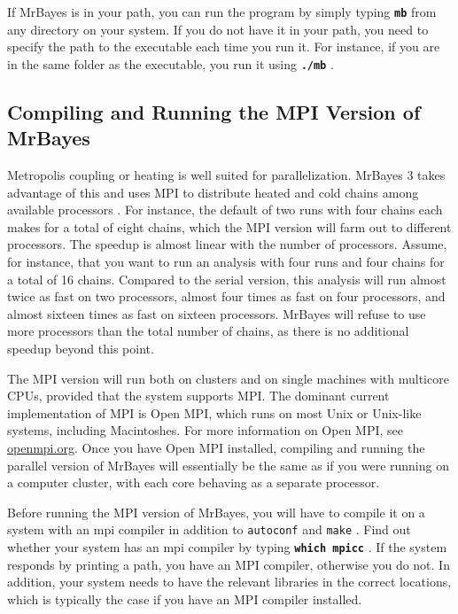 \documentclass[12pt]{book}
\newcommand{\ttt}[1]{\texttt{#1} }
\newcommand{\tb}[1]{\texttt{\textbf{#1}} }
\begin{document}
If MrBayes is in your path, you can run the program by simply typing \tb{mb} from any directory on
your system. If you do not have it in your path, you need to specify the path to the executable
each time you run it. For instance, if you are in the same folder as the executable, you run it
using \tb{./mb}.

\subsection{Compiling and Running the MPI Version of MrBayes}
\label{MPIversion}

Metropolis coupling or heating is well suited for parallelization. MrBayes 3 takes advantage of
this and uses MPI to distribute heated and cold chains among available processors
\citep{altekar04}. For instance, the default of two runs with four chains each makes for a total of
eight chains, which the MPI version will farm out to different processors. The speedup is almost
linear with the number of processors.  Assume, for instance, that you want to run an analysis with
four runs and four chains for a total of 16 chains. Compared to the serial version, this analysis
will run almost twice as fast on two processors, almost four times as fast on four processors, and
almost sixteen times as fast on sixteen processors.  MrBayes will refuse to use more processors
than the total number of chains, as there is no additional speedup beyond this point.

The MPI version will run both on clusters and on single machines with multicore CPUs, provided that
the system supports MPI. The dominant current implementation of MPI is Open MPI, which runs on most
Unix or Unix-like systems, including Macintoshes. For more information on Open MPI, see
\url{openmpi.org}. Once you have Open MPI installed, compiling and running the parallel version of
MrBayes will essentially be the same as if you were running on a computer cluster, with each core
behaving as a separate processor.

Before running the MPI version of MrBayes, you will have to compile it on a system with an mpi
compiler in addition to \ttt{autoconf} and \ttt{make}. Find out whether your system has an mpi
compiler by typing \tb{which mpicc}.  If the system responds by printing a path, you have an MPI
compiler, otherwise you do not. In addition, your system needs to have the relevant libraries in
the correct locations, which is typically the case if you have an MPI compiler installed.
\end{document}
